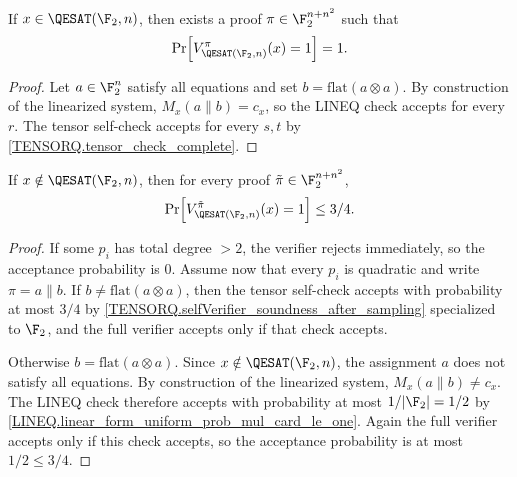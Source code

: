 \begin{lemma}[Completeness]
\label{QESAT.verifier_completeness}
\leanok
If \(x\in \QESAT(\F_2,n)\), then exists a proof
\(\pi\in\F_2^{n+n^2}\) such that \[\Pr\!\left[V_{\QESAT(\F_2,n)}^{\pi}(x)=1\right]=1.\]
\end{lemma}
\begin{proof}\leanok
Let \(a\in\F_2^n\) satisfy all equations and set
\(b=\mathrm{flat}(a\otimes a)\). By construction of the linearized system,
\(M_x(a\parallel b)=c_x\), so the LINEQ check
accepts for every \(r\). The tensor self-check accepts for every \(s,t\) by
\ref{TENSORQ.tensor_check_complete}.
\end{proof}

\begin{lemma}[Soundness]
\label{QESAT.verifier_soundness}
\leanok
If \(x\notin \QESAT(\F_2,n)\), then for every proof
\(\tilde\pi\in\F_2^{n+n^2}\),
\[\Pr\!\left[V_{\QESAT(\F_2,n)}^{\tilde\pi}(x)=1\right]\leq 3 / 4.\]
\end{lemma}
\begin{proof}\leanok
If some \(p_i\) has total degree \(>2\), the verifier rejects immediately, so
the acceptance probability is \(0\). Assume now that every \(p_i\) is quadratic
and write \(\pi=a\parallel b\). If \(b\neq\mathrm{flat}(a\otimes a)\), then
the tensor self-check accepts with probability at most \(3/4\) by
\ref{TENSORQ.selfVerifier_soundness_after_sampling} specialized to \(\F_2\), and
the full verifier accepts only if that check accepts.

Otherwise \(b=\mathrm{flat}(a\otimes a)\). Since \(x\notin\QESAT(\F_2,n)\),
the assignment \(a\) does not satisfy all equations. By construction of the
linearized system, \(M_x(a\parallel b)\neq c_x\). The LINEQ check
therefore accepts with probability at most \(1/|\F_2|=1/2\) by
\ref{LINEQ.linear_form_uniform_prob_mul_card_le_one}. Again the full verifier
accepts only if this check accepts, so the acceptance probability is at most
\(1/2\leq 3/4\).
\end{proof}

